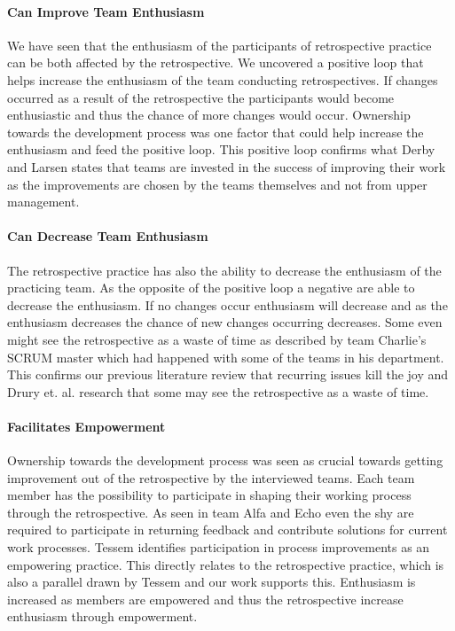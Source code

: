 \paragraph{Can Improve Team Enthusiasm}
\label{posi-loop}
We have seen that the enthusiasm of the participants of retrospective practice can be both affected by the retrospective. We uncovered a positive loop that helps increase the enthusiasm of the team conducting retrospectives. If changes occurred as a result of the retrospective the participants would become enthusiastic and thus the chance of more changes would occur. Ownership towards the development process was one factor that could help increase the enthusiasm and feed the positive loop. This positive loop confirms what Derby and Larsen \cite{Larsen2006} states that teams are invested in the success of improving their work as the improvements are chosen by the teams themselves and not from upper management. 

\paragraph{Can Decrease Team Enthusiasm}
\label{negi-loop}
The retrospective practice has also the ability to decrease the enthusiasm of the practicing team. As the opposite of the positive loop a negative are able to decrease the enthusiasm. If no changes occur enthusiasm will decrease and as the enthusiasm decreases the chance of new changes occurring decreases. Some even might see the retrospective as a waste of time as described by team Charlie's SCRUM master which had happened with some of the teams in his department. This confirms our previous literature review \cite{Dolvik2014} that recurring issues kill the joy and Drury et. al. \cite{Drury2012} research that some may see the retrospective as a waste of time. 

\paragraph{Facilitates Empowerment}
Ownership towards the development process was seen as crucial towards getting improvement out of the retrospective by the interviewed teams. Each team member has the possibility to participate in shaping their working process through the retrospective. As seen in team Alfa and Echo even the shy are required to participate in returning feedback and contribute solutions for current work processes. Tessem \cite{Tessem2014} identifies participation in process improvements as an empowering practice. This directly relates to the retrospective practice, which is also a parallel drawn by Tessem and our work supports this. Enthusiasm is increased as members are empowered\cite{Tessem2014} and thus the retrospective increase enthusiasm through empowerment. 

